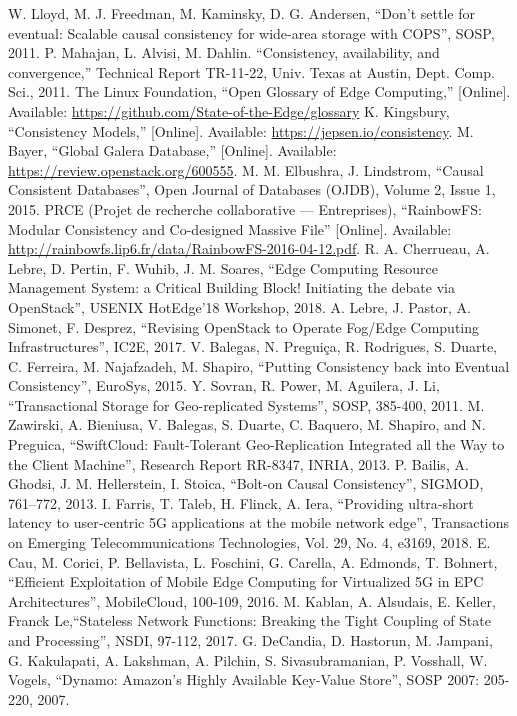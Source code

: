 \documentclass[conference]{IEEEtran}
\begin{document}
\begin{thebibliography}{00}
 W. Lloyd, M. J. Freedman, M. Kaminsky, D. G. Andersen, ``Don’t settle for eventual: Scalable causal consistency for wide-area storage with COPS'', SOSP, 2011.
 P. Mahajan, L. Alvisi, M. Dahlin. ``Consistency, availability, and convergence,'' Technical Report TR-11-22, Univ. Texas at Austin, Dept. Comp. Sci., 2011.
 The Linux Foundation, ``Open Glossary of Edge Computing,''
  [Online]. \newline Available: \url{https://github.com/State-of-the-Edge/glossary}
 K. Kingsbury, ``Consistency Models,'' [Online]. Available: \newline \url{https://jepsen.io/consistency}.
 M. Bayer, ``Global Galera Database,'' [Online]. Available: \newline \url{https://review.openstack.org/600555}. \newpage
{} M. M. Elbushra, J. Lindstrom, ``Causal Consistent Databases'', Open Journal of Databases (OJDB), Volume 2, Issue 1, 2015.
 PRCE (Projet de recherche collaborative — Entreprises), ``RainbowFS: Modular Consistency and Co-designed Massive File'' [Online]. Available: \url{http://rainbowfs.lip6.fr/data/RainbowFS-2016-04-12.pdf}.
 R. A. Cherrueau, A. Lebre, D. Pertin, F. Wuhib, J. M. Soares, ``Edge Computing Resource Management System: a Critical Building Block! Initiating the debate via OpenStack'', USENIX HotEdge’18 Workshop, 2018.
 A. Lebre, J. Pastor, A. Simonet, F. Desprez, ``Revising OpenStack to Operate Fog/Edge Computing Infrastructures'', IC2E, 2017.
 V. Balegas, N. Preguiça, R. Rodrigues, S. Duarte, C. Ferreira, M. Najafzadeh, M. Shapiro, ``Putting Consistency back into Eventual Consistency'', EuroSys, 2015.
 Y. Sovran, R. Power, M. Aguilera, J. Li, ``Transactional Storage for Geo-replicated Systems'', SOSP, 385-400, 2011.
 M. Zawirski, A. Bieniusa, V. Balegas, S. Duarte, C. Baquero, M. Shapiro, and N. Preguica, ``SwiftCloud: Fault-Tolerant Geo-Replication Integrated all the Way to the Client Machine'', Research Report RR-8347, INRIA, 2013.
 P. Bailis, A. Ghodsi, J. M. Hellerstein, I. Stoica, ``Bolt-on Causal Consistency'', SIGMOD, 761–772, 2013.
 I. Farris, T. Taleb, H. Flinck, A. Iera, ``Providing ultra‐short latency to user‐centric 5G applications at the mobile network edge'', Transactions on Emerging Telecommunications Technologies, Vol. 29, No. 4, e3169, 2018.
 E. Cau, M. Corici, P. Bellavista, L. Foschini, G. Carella, A. Edmonds, T. Bohnert, ``Efficient Exploitation of Mobile Edge Computing for Virtualized 5G in EPC Architectures'', MobileCloud, 100-109, 2016.
 M. Kablan, A. Alsudais, E. Keller, Franck Le,``Stateless Network Functions: Breaking the Tight Coupling of State and Processing'', NSDI, 97-112, 2017.
 G. DeCandia, D. Hastorun, M. Jampani, G. Kakulapati, A. Lakshman, A. Pilchin, S. Sivasubramanian, P. Vosshall, W. Vogels, ``Dynamo: Amazon's Highly Available Key-Value Store'', SOSP 2007: 205-220, 2007.
\end{thebibliography}
\end{document}
